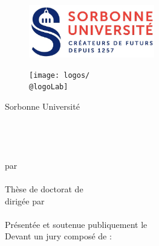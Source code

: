 \begin{titlepage}	
	\begin{center}
		\begin{figure}
			\centering
			\vspace*{-1.5cm}
			\begin{minipage}{.38\textwidth}
				\centering
				\includegraphics[height=2.3cm]{logos/logoSU}
			\end{minipage} \hfill
			\begin{minipage}{.38\textwidth}
				\centering
				\texttt{[image: logos/\\@logoLab]}
			\end{minipage}
		\end{figure}
		\vspace*{0.5cm}
		{\Huge Sorbonne Université}\\
		\vspace*{0.8cm}
		{\LARGE \@docschool}\\
		\vspace*{0.5cm}
		{\LARGE\textit{ \@lab }}\\
		\vspace*{2cm}
		{\LARGE\textsc \@title }\\
		\vspace{0.2cm}
		{\LARGE \textit \@subtitle}\\
		\vspace*{1cm}
		{\large par\\
			\vspace*{0.1cm}
			{\bfseries\@author}}\\
		\vspace*{0.8cm}
		{\large Thèse de doctorat de \@rfield}\\
		\vspace*{0.5cm}
		{\large dirigée par\\
			\vspace*{0.1cm}
			\@supervisors}\\
		\vspace{1cm}
		Présentée et soutenue publiquement le \@defdate\\
		\vspace*{1cm}
		Devant un jury composé de : \\
		\vspace{0.5cm}
		
		\jury
		
		\vfill
	\end{center}
\end{titlepage}

\restoregeometry